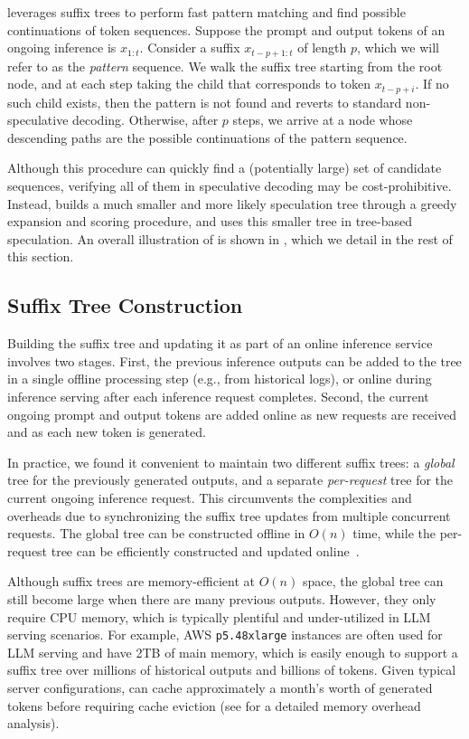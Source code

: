 \SuffixDecoding leverages suffix trees to perform fast pattern matching and find possible continuations of token sequences. Suppose the prompt and output tokens of an ongoing inference is \( x_{1:t} \). Consider a suffix \( x_{t-p+1:t} \) of length \( p \), which we will refer to as the \emph{pattern} sequence. We walk the suffix tree starting from the root node, and at each step taking the child that corresponds to token \( x_{t-p+i} \). If no such child exists, then the pattern is not found and \SuffixDecoding reverts to standard non-speculative decoding. Otherwise, after \( p \) steps, we arrive at a node whose descending paths are the possible continuations of the pattern sequence.

Although this procedure can quickly find a (potentially large) set of candidate sequences, verifying all of them in speculative decoding may be cost-prohibitive. Instead, \SuffixDecoding builds a much smaller and more likely speculation tree through a greedy expansion and scoring procedure, and uses this smaller tree in tree-based speculation. An overall illustration of \SuffixDecoding is shown in , which we detail in the rest of this section.

\subsection{Suffix Tree Construction}
\label{suffixdecoding:sec:construction}

Building the suffix tree and updating it as part of an online inference service involves two stages. First, the previous inference outputs can be added to the tree in a single offline processing step (e.g., from historical logs), or online during inference serving after each inference request completes. Second, the current ongoing prompt and output tokens are added online as new requests are received and as each new token is generated.

In practice, we found it convenient to maintain two different suffix trees: a \emph{global} tree for the previously generated outputs, and a separate \emph{per-request} tree for the current ongoing inference request. This circumvents the complexities and overheads due to synchronizing the suffix tree updates from multiple concurrent requests. The global tree can be constructed offline in \( O(n) \) time, while the per-request tree can be efficiently constructed and updated online~\citep{10.1007/BF01206331}.

Although suffix trees are memory-efficient at \( O(n) \) space, the global tree can still become large when there are many previous outputs. However, they only require CPU memory, which is typically plentiful and under-utilized in LLM serving scenarios. For example, AWS \texttt{p5.48xlarge} instances are often used for LLM serving and have 2TB of main memory, which is easily enough to support a suffix tree over millions of historical outputs and billions of tokens. Given typical server configurations, \SuffixDecoding can cache approximately a month's worth of generated tokens before requiring cache eviction (see  for a detailed memory overhead analysis).

